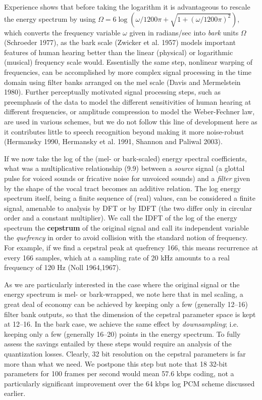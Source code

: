 Experience shows that before taking the logarithm it is advantageous to
rescale the energy spectrum by using $\Omega =
6\log(\omega/1200\pi+\sqrt{1+(\omega/1200\pi)^2})$, which converts the
frequency variable $\omega$ given in radians/sec into {\it bark} units
$\Omega$ (Schroeder 1977)\nocite{Schroeder:1977}, as the bark scale (Zwicker
et al.  1957)\nocite{Zwicker:1957} models important features of human hearing
better than the linear (physical) or logarithmic (musical) frequency scale
would. Essentially the same step, nonlinear warping of
frequencies, can be accomplished by more complex signal processing in the time
domain using filter banks arranged on the mel scale (Davis and Mermelstein
1980).\nocite{Davis:1980} Further perceptually motivated signal processing
steps, such as preemphasis of the data to model the different sensitivities of
human hearing at different frequencies, or amplitude compression to model the
Weber-Fechner law, are used in various schemes, but we do not follow this line
of development here as it contributes little to speech recognition beyond
making it more noise-robust (Hermansky 1990, Hermansky et al. 1991, Shannon
and Paliwal 2003).
\nocite{Hermansky:1990}\nocite{Hermansky:1991}\nocite{Shannon:2003}

If we now take the log of the (mel- or bark-scaled) energy spectral
coefficients, what was a multiplicative relationship (9.9) between a {\it
  source} signal (a glottal pulse for voiced sounds or fricative noise for
unvoiced sounds) and a {\it filter} given by the shape of the vocal tract
becomes an additive relation. The log energy spectrum itself, being a finite
sequence of (real) values, can be considered a finite signal, amenable to
analysis by DFT or by IDFT (the two differ only in circular order and a
constant multiplier). We call the IDFT of the log of the energy spectrum the
{\bf cepstrum} of the original signal and call its independent
variable the {\it quefrency} in order to avoid collision with
the standard notion of frequency. For example, if we find a cepstral peak at
quefrency 166, this means recurrence at every 166 samples, which at a sampling
rate of 20 kHz amounts to a real frequency of 120 Hz (Noll
1964,1967).\nocite{Noll:1964}\nocite{Noll:1967}

As we are particularly interested in the case where the original signal or the
energy spectrum is mel- or bark-wrapped, we note here that in mel scaling, a
great deal of economy can be achieved by keeping only a few (generally 12--16)
filter bank outputs, so that the dimension of the cepstral parameter space is
kept at 12--16. In the bark case, we achieve the same effect by {\it
  downsampling}; i.e. keeping only a few (generally 16--20)
points in the energy spectrum. To fully assess the savings entailed by these
steps would require an analysis of the quantization losses. Clearly, 32 bit
resolution on the cepstral parameters is far more than what we need. We
postpone this step but note that 18 32-bit parameters for 100 frames per
second would mean 57.6 kbps coding, not a particularly significant
improvement over the 64 kbps log PCM scheme discussed earlier.

